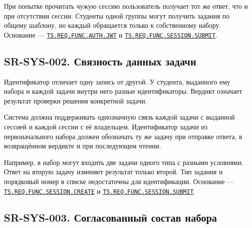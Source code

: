 \documentclass[12pt,a4paper]{article}
\begin{document}
При попытке прочитать чужую сессию пользователь получает тот же ответ, что и при отсутствии сессии. Студенты одной группы могут получить задания по общему шаблону, но каждый обращается только к собственному набору. Основание --- {\href{../02\_Техническое\_задание/DOC-02\_Техническое\_задание.pdf\#ts-req-func-auth-jwt}{\texttt{TS.\allowbreak{}REQ.\allowbreak{}FUNC.\allowbreak{}AUTH.\allowbreak{}JWT}}} и {\href{../02\_Техническое\_задание/DOC-02\_Техническое\_задание.pdf\#ts-req-func-session-submit}{\texttt{TS.\allowbreak{}REQ.\allowbreak{}FUNC.\allowbreak{}SESSION.\allowbreak{}SUBMIT}}}.

\subsection{SR-SYS-002. Связность данных задачи}\label{sr-sys-002-ux441ux432ux44fux437ux43dux43eux441ux442ux44c-ux434ux430ux43dux43dux44bux445-ux437ux430ux434ux430ux447ux438}

\hypertarget{sr-sys-002-связность-данных-задачи}{}

\hypertarget{sr-sys-002}{}

Идентификатор отличает одну запись от другой. У студента, выданного ему набора и каждой задачи внутри него разные идентификаторы. Вердикт означает результат проверки решения конкретной задачи.

Система должна поддерживать однозначную связь каждой задачи с выданной сессией и каждой сессии с её владельцем. Идентификатор задачи из первоначального набора должен обозначать ту же задачу при отправке ответа, в возвращённом вердикте и при последующем чтении.

Например, в набор могут входить две задачи одного типа с разными условиями. Ответ на вторую задачу изменяет результат только второй. Тип задания и порядковый номер в списке недостаточны для идентификации. Основание --- {\href{../02\_Техническое\_задание/DOC-02\_Техническое\_задание.pdf\#ts-req-func-session-create}{\texttt{TS.\allowbreak{}REQ.\allowbreak{}FUNC.\allowbreak{}SESSION.\allowbreak{}CREATE}}} и {\href{../02\_Техническое\_задание/DOC-02\_Техническое\_задание.pdf\#ts-req-func-session-submit}{\texttt{TS.\allowbreak{}REQ.\allowbreak{}FUNC.\allowbreak{}SESSION.\allowbreak{}SUBMIT}}}.

\subsection{SR-SYS-003. Согласованный состав набора}\label{sr-sys-003-ux441ux43eux433ux43bux430ux441ux43eux432ux430ux43dux43dux44bux439-ux441ux43eux441ux442ux430ux432-ux43dux430ux431ux43eux440ux430}
\end{document}
